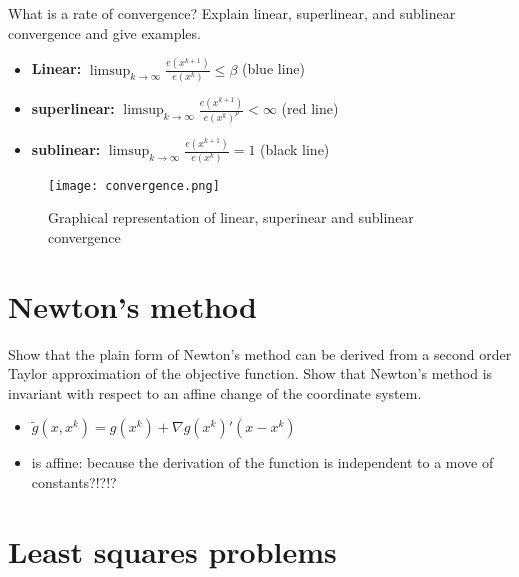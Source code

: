 \documentclass{article}
\begin{document}
\begin{question}
  What is a rate of convergence? Explain linear, superlinear, and sublinear convergence and give
  examples.
\end{question}
\begin{itemize}
\item \textbf{Linear:} $\limsup_{k \rightarrow \infty} \frac{e(x^{k+1})}{e(x^k)}\leq \beta$ (blue line)
\item \textbf{superlinear:} $\limsup_{k \rightarrow \infty} \frac{e(x^{k+1})}{e(x^k)^p} < \infty$ (red line)
\item \textbf{sublinear:} $\limsup_{k \rightarrow \infty} \frac{e(x^{k+1})}{e(x^k)} = 1$ (black line)
\end{itemize}

\begin{figure}[H]
  \texttt{[image: convergence.png]}
  \caption{Graphical representation of linear, superinear and sublinear
    convergence \label{fig:desc_dir}}
\end{figure}

\section{Newton's method}

\begin{question}
  Show that the plain form of Newton’s method can be derived from a second order Taylor
  approximation of the objective function. Show that Newton’s method is invariant with respect to an
  affine change of the coordinate system.
\end{question}
\begin{itemize}
\item $\tilde{g}(x, x^k) = g(x^k) + \nabla g(x^k)'(x - x^k)$
\item is affine: because the derivation of the function is independent to a move of constants?!?!?
\end{itemize}

\section{Least squares problems}
\end{document}
